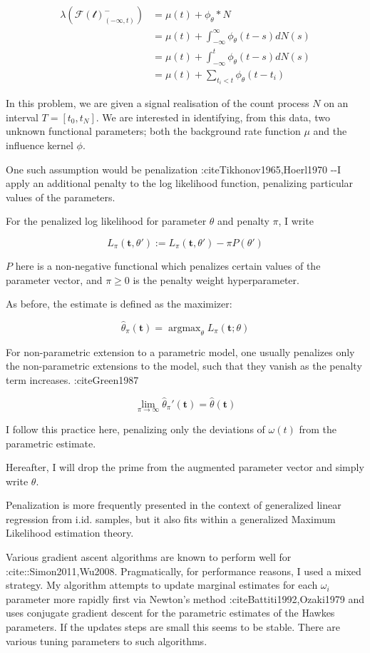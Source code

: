 \documentclass[11pt]{article}
\def\lt{<}
\begin{document}
\[
\begin{aligned}
\lambda(\mathcal{F(t)}^-_{(-\infty,t)}) &= \mu(t) + \phi_\theta * N\\
&= \mu(t)  + \int_{-\infty}^{\infty}\phi_\theta(t-s)dN(s)\\
&= \mu(t) + \int_{-\infty}^{t}\phi_\theta(t-s)dN(s)\\
&= \mu(t) + \sum_{t_i\lt t}\phi_\theta(t-t_i)
\end{aligned}
\]

In this problem, we are given a signal realisation of the count process
$N$ on an interval $T=[t_0,t_N]$. We are interested in identifying, from
this data, two unknown functional parameters; both the background rate
function $\mu$ and the influence kernel $\phi$.

    One such assumption would be penalization :citeTikhonov1965,Hoerl1970
-{}-I apply an additional penalty to the log likelihood function,
penalizing particular values of the parameters.

For the penalized log likelihood for parameter $\theta$ and penalty
$\pi$, I write

\[L_\pi(\mathbf t, \theta'):= L_\pi(\mathbf t, \theta')- \pi P(\theta')\]

$P$ here is a non-negative functional which penalizes certain values of
the parameter vector, and $\pi\geq 0$ is the penalty weight
hyperparameter.

As before, the estimate is defined as the maximizer:

\[\hat{\theta}_\pi(\mathbf t) = \operatorname{argmax}_\theta L_\pi(\mathbf t;\theta)\]

For non-parametric extension to a parametric model, one usually
penalizes only the non-parametric extensions to the model, such that
they vanish as the penalty term increases. :citeGreen1987

\[\lim_{\pi\to\infty}\hat{\theta}_\pi'(\mathbf t) =\hat{\theta}(\mathbf t)\]

I follow this practice here, penalizing only the deviations of
$\omega(t)$ from the parametric estimate.

Hereafter, I will drop the prime from the augmented parameter vector and
simply write $\theta$.

Penalization is more frequently presented in the context of generalized
linear regression from i.id. samples, but it also fits within a
generalized Maximum Likelihood estimation theory.

Various gradient ascent algorithms are known to perform well for
:cite::Simon2011,Wu2008. Pragmatically, for performance reasons, I used
a mixed strategy. My algorithm attempts to update marginal estimates for
each $\omega_i$ parameter more rapidly first via Newton's method
:citeBattiti1992,Ozaki1979 and uses conjugate gradient descent for the
parametric estimates of the Hawkes parameters. If the updates steps are
small this seems to be stable. There are various tuning parameters to
such algorithms.
\end{document}
